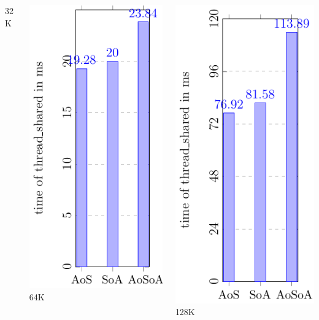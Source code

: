 \documentclass[aspectratio=169]{beamer}
\begin{document}
\begin{frame}
\begin{columns}
\begin{column}{0.25\textwidth}
	\small 32K
	\end{column}
	\begin{column}{0.25\textwidth}
	\includegraphics[scale=0.55]{figures/fig30.pdf}
	\small 64K
	\end{column}
	\begin{column}{0.25\textwidth}
	\includegraphics[scale=0.55]{figures/fig40.pdf}
	\small 128K
	\end{column}	
	\end{columns}
	
\end{frame}
\end{document}
